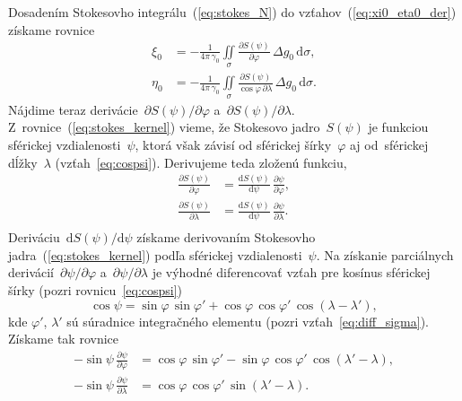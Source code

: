 \documentclass[a4paper,12pt]{book}
\newcommand{\diff}{\mathrm d}
\begin{document}
Dosadením Stokesovho integrálu~(\ref{eq:stokes_N}) do 
vzťahov~(\ref{eq:xi0_eta0_der}) získame rovnice
%
\begin{equation}
\label{eq:vm}
\begin{split}
\xi_0 &= -\frac{1}{4\pi\,\gamma_0} \iint\limits_\sigma \frac{\partial 
S(\psi)}{\partial \varphi} \, \Delta g_0 \, \diff\sigma{,}\\
\eta_0 &= -\frac{1}{4\pi\,\gamma_0} \iint\limits_\sigma \frac{\partial 
S(\psi)}{\cos\varphi \, \partial \lambda} \, \Delta g_0 \, \diff\sigma{.}
\end{split}
\end{equation}
%
Nájdime teraz derivácie~$\partial S(\psi) \slash \partial\varphi$ a~$\partial 
S(\psi) \slash \partial\lambda$.  Z~rovnice~(\ref{eq:stokes_kernel}) vieme, že 
Stokesovo jadro~$S(\psi)$ je funkciou sférickej vzdialenosti~$\psi$, ktorá však 
závisí od sférickej šírky~$\varphi$ aj od~sférickej dĺžky~$\lambda$ 
(vzťah~\ref{eq:cospsi}).  Derivujeme teda zloženú funkciu,
%
\begin{equation}
\label{eq:stokes_kernel_partials}
\begin{split}
\frac{\partial S(\psi)}{\partial \varphi} &= \frac{\diff S(\psi)}{\diff \psi} 
\, \frac{\partial\psi}{\partial\varphi}{,}\\
%
\frac{\partial S(\psi)}{\partial \lambda} &= \frac{\diff S(\psi)}{\diff \psi} 
\, \frac{\partial\psi}{\partial\lambda}{.}\\
\end{split}
\end{equation}
%
Deriváciu~$\diff S(\psi) \slash \diff \psi$ získame derivovaním Stokesovho 
jadra~(\ref{eq:stokes_kernel}) podľa sférickej vzdialenosti~$\psi$.  Na 
získanie parciálnych derivácií~$\partial\psi \slash \partial\varphi$ 
a~$\partial\psi \slash \partial\lambda$ je výhodné diferencovať vzťah pre 
kosínus sférickej šírky (pozri rovnicu~\ref{eq:cospsi})
%
\begin{equation}
\cos\psi = \sin\varphi \, \sin\varphi' + \cos\varphi \, \cos\varphi' \,
\cos(\lambda - \lambda'){,}
\end{equation}
%
kde $\varphi'$, $\lambda'$ sú súradnice integračného elementu (pozri 
vzťah~\ref{eq:diff_sigma}).  Získame tak rovnice
%
\begin{equation}
\label{eq:vm_aux}
\begin{split}
-\sin\psi \, \frac{\partial \psi}{\partial \varphi} &= \cos\varphi \, 
\sin\varphi' - \sin\varphi \, \cos\varphi' \, \cos(\lambda' - \lambda) {,}\\
-\sin\psi \, \frac{\partial \psi}{\partial \lambda} &= \cos\varphi \, 
\cos\varphi' \, \sin(\lambda' - \lambda){.}
\end{split}
\end{equation}
\end{document}

